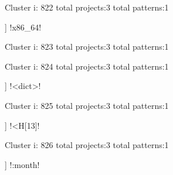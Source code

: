 Cluster i: 822
total projects:3
total patterns:1
\begin{multicols}{1}
\begin{description}[noitemsep,topsep=0pt]
\item [[3] ] \cverb!x86_64!
\end{description}
\end{multicols}







Cluster i: 823
total projects:3
total patterns:1
\begin{multicols}{1}
\end{multicols}







Cluster i: 824
total projects:3
total patterns:1
\begin{multicols}{1}
\begin{description}[noitemsep,topsep=0pt]
\item [[3] ] \cverb!<dict>!
\end{description}
\end{multicols}







Cluster i: 825
total projects:3
total patterns:1
\begin{multicols}{1}
\begin{description}[noitemsep,topsep=0pt]
\item [[3] ] \cverb!<H[13]!
\end{description}
\end{multicols}







Cluster i: 826
total projects:3
total patterns:1
\begin{multicols}{1}
\begin{description}[noitemsep,topsep=0pt]
\item [[3] ] \cverb!:month!
\end{description}
\end{multicols}







